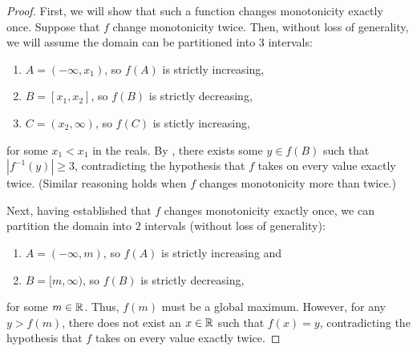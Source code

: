 \begin{problem}
\begin{proof}
    First, we will show that such a function changes monotonicity exactly once.
    Suppose that $f$ change monotonicity twice. Then, without loss of generality, we will
    assume the domain can be partitioned into $3$ intervals:
    \begin{enumerate}[label=(\roman*)]
      \item $A = (-\infty, x_{1})$, so $f(A)$ is strictly increasing,
      \item $B = [x_{1}, x_{2}]$, so $f(B)$ is strictly decreasing,
      \item $C = (x_{2}, \infty)$, so $f(C)$ is stictly increasing,
    \end{enumerate}
    for some $x_{1} < x_{1}$ in the reals.
    By , there exists some $y \in f(B)$
    such that $|f^{-1}(y)| \geq 3$, contradicting the hypothesis that $f$ takes
    on every value exactly twice. (Similar reasoning holds when $f$ changes
    monotonicity more than twice.)

    Next, having established that $f$ changes monotonicity exactly once,
    we can partition the domain into $2$ intervals (without loss of generality):
    \begin{enumerate}[label=(\roman*)]
      \item $A = (-\infty, m)$, so $f(A)$ is strictly increasing and
      \item $B = [m, \infty)$, so $f(B)$ is strictly decreasing,
    \end{enumerate}
    for some $m \in \mathbb{R}$.
    Thus, $f(m)$ must be a global maximum. However, for any $y > f(m)$, there
    does not exist an $x \in \mathbb{R}$ such that $f(x) = y$, contradicting the hypothesis that 
    $f$ takes on every value exactly twice.

  \end{proof}

\end{problem}


